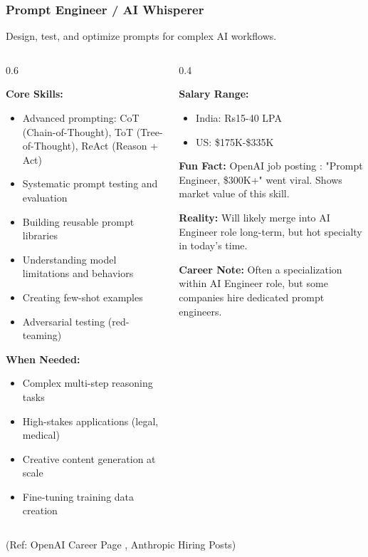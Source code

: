 \begin{frame}[fragile]\frametitle{Prompt Engineer / AI Whisperer}
Design, test, and optimize prompts for complex AI workflows.

\begin{columns}
\begin{column}[T]{0.6\linewidth}

\textbf{Core Skills:}
\begin{itemize}
\item Advanced prompting: CoT (Chain-of-Thought), ToT (Tree-of-Thought), ReAct (Reason + Act)
\item Systematic prompt testing and evaluation
\item Building reusable prompt libraries
\item Understanding model limitations and behaviors
\item Creating few-shot examples
\item Adversarial testing (red-teaming)
\end{itemize}

\textbf{When Needed:}
\begin{itemize}
\item Complex multi-step reasoning tasks
\item High-stakes applications (legal, medical)
\item Creative content generation at scale
\item Fine-tuning training data creation
\end{itemize}


\end{column}
\begin{column}[T]{0.4\linewidth}

\textbf{Salary Range:}
\begin{itemize}
\item India: Rs15-40 LPA
\item US: \$175K-\$335K
\end{itemize}

\textbf{Fun Fact:}
OpenAI job posting : "Prompt Engineer, \$300K+" went viral. Shows market value of this skill.

\vspace{0.3cm}
\textbf{Reality:}
Will likely merge into AI Engineer role long-term, but hot specialty in today's time.

\vspace{0.3cm}
\textbf{Career Note:}
Often a specialization within AI Engineer role, but some companies hire dedicated prompt engineers.
\end{column}
\end{columns}

{\tiny (Ref: OpenAI Career Page , Anthropic Hiring Posts)}
\end{frame}

